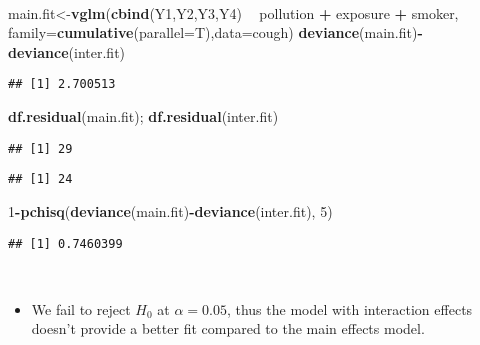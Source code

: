 \documentclass[]{article}
\newenvironment{Shaded}{\begin{snugshade}}{\end{snugshade}}
\newcommand{\KeywordTok}[1]{\textcolor[rgb]{0.13,0.29,0.53}{\textbf{#1}}}
\newcommand{\DataTypeTok}[1]{\textcolor[rgb]{0.13,0.29,0.53}{#1}}
\newcommand{\DecValTok}[1]{\textcolor[rgb]{0.00,0.00,0.81}{#1}}
\newcommand{\StringTok}[1]{\textcolor[rgb]{0.31,0.60,0.02}{#1}}
\newcommand{\OperatorTok}[1]{\textcolor[rgb]{0.81,0.36,0.00}{\textbf{#1}}}
\newcommand{\NormalTok}[1]{#1}
\begin{document}
~

\begin{Shaded}
\begin{Highlighting}[]
\NormalTok{main.fit<-}\KeywordTok{vglm}\NormalTok{(}\KeywordTok{cbind}\NormalTok{(Y1,Y2,Y3,Y4) }\OperatorTok{~}\StringTok{ }\NormalTok{pollution }\OperatorTok{+}\StringTok{ }\NormalTok{exposure }\OperatorTok{+}\StringTok{ }\NormalTok{smoker,}
               \DataTypeTok{family=}\KeywordTok{cumulative}\NormalTok{(}\DataTypeTok{parallel=}\NormalTok{T),}\DataTypeTok{data=}\NormalTok{cough)}
\KeywordTok{deviance}\NormalTok{(main.fit)}\OperatorTok{-}\KeywordTok{deviance}\NormalTok{(inter.fit)}
\end{Highlighting}
\end{Shaded}

\begin{verbatim}
## [1] 2.700513
\end{verbatim}

\begin{Shaded}
\begin{Highlighting}[]
\KeywordTok{df.residual}\NormalTok{(main.fit); }\KeywordTok{df.residual}\NormalTok{(inter.fit)}
\end{Highlighting}
\end{Shaded}

\begin{verbatim}
## [1] 29
\end{verbatim}

\begin{verbatim}
## [1] 24
\end{verbatim}

\begin{Shaded}
\begin{Highlighting}[]
\DecValTok{1}\OperatorTok{-}\KeywordTok{pchisq}\NormalTok{(}\KeywordTok{deviance}\NormalTok{(main.fit)}\OperatorTok{-}\KeywordTok{deviance}\NormalTok{(inter.fit), }\DecValTok{5}\NormalTok{)}
\end{Highlighting}
\end{Shaded}

\begin{verbatim}
## [1] 0.7460399
\end{verbatim}

~

\begin{itemize}
\item[] We fail to reject $H_0$ at $\alpha = 0.05$, thus the model with interaction effects doesn't provide a better fit compared to the main effects model.
\end{itemize}
\end{document}
